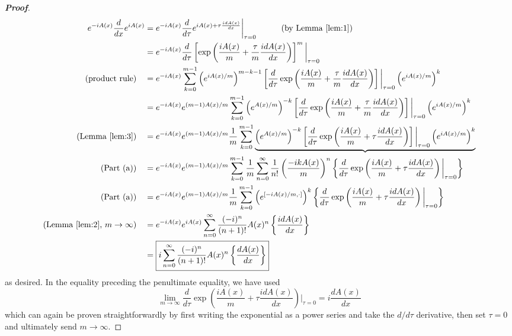 \documentclass{article}
\theoremstyle{definition}
\newcommand{\f}[2]{\frac{#1}{#2}}
\newcommand{\lp}{\left(}
\newcommand{\rp}{\right)}
\newcommand{\lb}{\left[}
\newcommand{\rb}{\right]}
\newcommand{\lc}{\left\{}
\newcommand{\rc}{\right\}}
\begin{document}
\begin{enumerate}[label=(\alph*)]
	\begin{proof}[\textbf{Proof}]
		\begin{align*}
		e^{-iA(x)} \f{d}{dx} e^{iA(x)} 
		&= e^{-iA(x)}\f{d}{d\tau} e^{iA(x) + \tau \f{idA(x)}{dx}} \bigg\vert_{\tau = 0} \quad\quad\quad (\text{by Lemma \ref{lem:1}})\\
		&= e^{-iA(x)} \f{d}{d\tau} \lb \exp\lp \f{iA(x)}{m} + \f{\tau}{m} \f{idA(x)}{dx} \rp \rb^m \bigg\vert_{\tau = 0}\\
		\text{(product rule)}\quad&= e^{-iA(x)}
		\sum^{m-1}_{k=0}
		\lp e^{iA(x)/m}\rp^{m-k-1}
		\lb \f{d}{d\tau} 
		\exp \lp \f{iA(x)}{m} + \f{\tau}{m}\f{idA(x)}{dx} \rp  
		\rb \bigg\vert_{\tau = 0}
		\lp e^{iA(x)/m} \rp^k\\
		&= e^{-iA(x)}e^{(m-1)A(x)/m} \sum^{m-1}_{k=0} \lp e^{A(x)/m}\rp^{-k}
		\lb \f{d}{d\tau} 
		\exp \lp \f{iA(x)}{m} + \f{\tau}{m}\f{idA(x)}{dx} \rp  
		\rb \bigg\vert_{\tau = 0}
		\lp e^{iA(x)/m} \rp^k
		 \\
		 \text{(Lemma \ref{lem:3})}\quad &= e^{-iA(x)}e^{(m-1)A(x)/m} \f{1}{m} \sum^{m-1}_{k=0} \underbrace{\lp e^{A(x)/m}\rp^{-k}
		 \lb \f{d}{d\tau} 
		 \exp \lp \f{iA(x)}{m} + \tau\f{idA(x)}{dx} \rp  
		 \rb \bigg\vert_{\tau = 0}
		 \lp e^{iA(x)/m} \rp^k}\\
		 \text{(Part (a))}\quad
		 &= e^{-iA(x)}e^{(m-1)A(x)/m} \sum^{m-1}_{k=0} \f{1}{m} \sum^\infty_{n=0} \f{1}{n!} \lp \f{-ikA(x)}{m} \rp^n \lc  \f{d}{d\tau} 
		 \exp \lp \f{iA(x)}{m} + \tau\f{idA(x)}{dx} \rp  
		 \bigg\vert_{\tau = 0}  \rc\\
		 \text{(Part (a))}\quad 
		 &= e^{-iA(x)}e^{(m-1)A(x)/m} \f{1}{m}\sum^{m-1}_{k=0}
		 \lp e^{[-iA(x)/m,\cdot]} \rp^k
		 \lc  \f{d}{d\tau} 
		 \exp \lp \f{iA(x)}{m} + \tau\f{idA(x)}{dx} \rp  
		  \bigg\vert_{\tau = 0}  \rc\\
		 \text{(Lemma \ref{lem:2}, $m\to \infty$)}  \quad 
		 &= e^{-iA(x)} e^{iA(x)} \sum^\infty_{n=0}\f{(-i)^n}{(n+1)!}A(x)^n \lc \f{idA(x)}{dx} \rc\\
		 &= \boxed{i\sum^\infty_{n=0}\f{(-i)^n}{(n+1)!}A(x)^n \lc \f{dA(x)}{dx} \rc}
		\end{align*}
		as desired. In the equality preceding the penultimate equality, we have used 
		\begin{equation*}
		\lim_{m\to \infty}\f{d}{d\tau} 
		\exp \lp \f{iA(x)}{m} + \tau\f{idA(x)}{dx} \rp  
		\bigg\vert_{\tau = 0} = i\f{dA(x)}{dx}
		\end{equation*}
		which can again be proven straightforwardly by first writing the exponential as a power series and take the $d/d\tau$ derivative, then set $\tau = 0$ and ultimately send $m\to \infty$. 
	\end{proof}
	
\end{enumerate}
	
	
\end{document}
